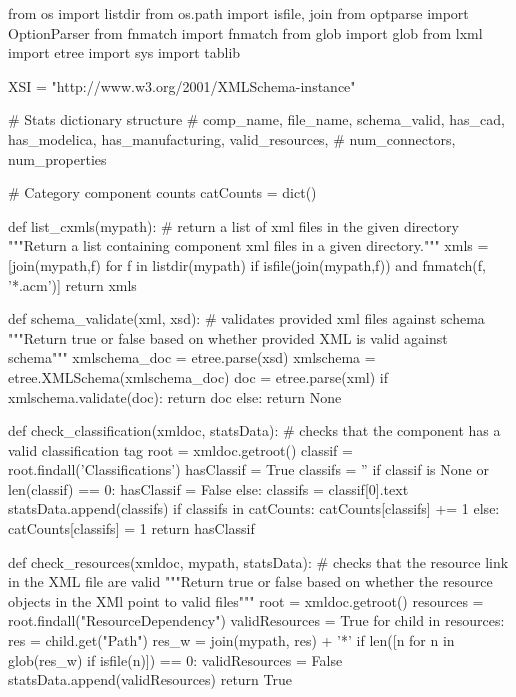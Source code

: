 \begin{MyVerbatim}
from os import listdir
from os.path import isfile, join
from optparse import OptionParser
from fnmatch import fnmatch
from glob import glob
from lxml import etree
import sys
import tablib

XSI = "{http://www.w3.org/2001/XMLSchema-instance}"

# Stats dictionary structure
# comp_name, file_name, schema_valid, has_cad, has_modelica, 
      has_manufacturing, valid_resources,
#              num_connectors, num_properties

# Category component counts
catCounts = dict()

def list_cxmls(mypath):  # return a list of xml files in the given directory
    """Return a list containing component xml files in a given directory."""
    xmls = [join(mypath,f) for f in listdir(mypath) if 
        isfile(join(mypath,f)) and fnmatch(f, '*.acm')]
    return xmls


def schema_validate(xml, xsd):  # validates provided xml files against schema
    """Return true or false based on whether provided XML is valid against 
       schema"""
    xmlschema_doc = etree.parse(xsd)
    xmlschema = etree.XMLSchema(xmlschema_doc)
    doc = etree.parse(xml)
    if xmlschema.validate(doc):
        return doc
    else:
        return None


def check_classification(xmldoc, statsData):  # checks that the component 
                                                has a valid classification tag
    root = xmldoc.getroot()
    classif = root.findall('Classifications')
    hasClassif = True
    classifs = ''
    if classif is None or len(classif) == 0:
        hasClassif = False
    else:
        classifs = classif[0].text
    statsData.append(classifs)
    if classifs in catCounts:
        catCounts[classifs] += 1
    else:
        catCounts[classifs] = 1
    return hasClassif


def check_resources(xmldoc, mypath, statsData):  # checks that the resource 
                                                   link in the XML file are valid
    """Return true or false based on whether the resource objects in the 
       XMl point to valid files"""
    root = xmldoc.getroot()
    resources = root.findall("ResourceDependency")
    validResources = True
    for child in resources:
        res = child.get("Path")
        res_w = join(mypath, res) + '*'
        if len([n for n in glob(res_w) if isfile(n)]) == 0:
            validResources = False
    statsData.append(validResources)
    return True


\end{MyVerbatim}
